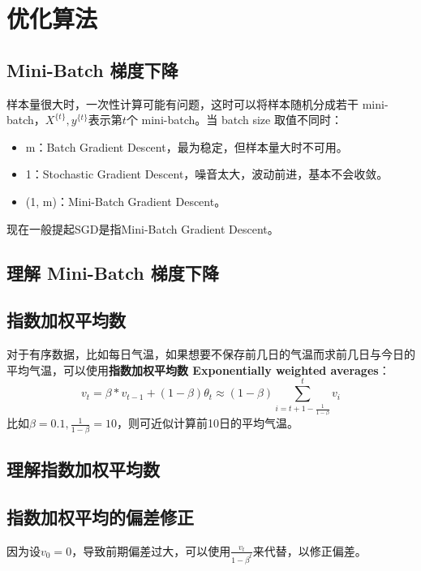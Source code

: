 \documentclass[../../main.tex]{subfiles}
\begin{document}
\chapter{优化算法}

\section{Mini-Batch 梯度下降}

样本量很大时，一次性计算可能有问题，这时可以将样本随机分成若干 mini-batch，\(X^{\{t\}}, y^{\{t\}}\)表示第\(t\)个 mini-batch。当 batch size 取值不同时：
\begin{itemize}
    \item m：Batch Gradient Descent，最为稳定，但样本量大时不可用。
    \item 1：Stochastic Gradient Descent，噪音太大，波动前进，基本不会收敛。
    \item (1, m)：Mini-Batch Gradient Descent。
\end{itemize}
\begin{remark}
    现在一般提起SGD是指Mini-Batch Gradient Descent。
\end{remark}


\section{理解 Mini-Batch 梯度下降}

\section{指数加权平均数}
对于有序数据，比如每日气温，如果想要不保存前几日的气温而求前几日与今日的平均气温，可以使用\textbf{指数加权平均数 Exponentially weighted averages}：
\[v_t = β*v_{t-1} + (1-β)θ_t ≈ (1-β)\sum\limits_{i=t + 1 - \frac{1}{1-β}}^{t}v_i\]
比如\(β=0.1, \frac{1}{1-β}=10\)，则可近似计算前10日的平均气温。


\section{理解指数加权平均数}

\section{指数加权平均的偏差修正}
因为设\(v_0 = 0\)，导致前期偏差过大，可以使用\(\frac{v_t}{1-β^t}\)来代替，以修正偏差。
\end{document}
